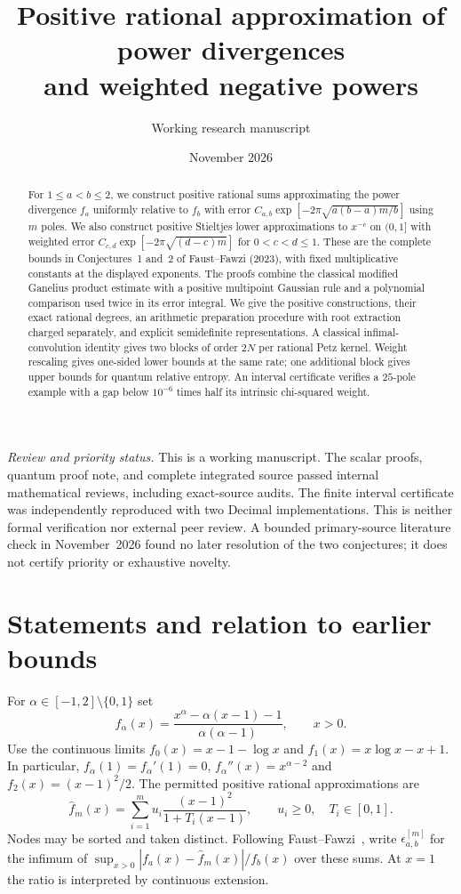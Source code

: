 \documentclass[11pt]{article}
\title{Positive rational approximation of power divergences\texorpdfstring{\\}{ }and weighted negative powers}
\author{Working research manuscript}
\date{November 2026}
\numberwithin{equation}{section}
\begin{document}
\maketitle

\begin{abstract}
For $1\le a<b\le2$, we construct positive rational sums approximating
the power divergence $f_a$ uniformly relative to $f_b$ with error
$C_{a,b}\exp[-2\pi\sqrt{a(b-a)m/b}]$ using $m$ poles. We also construct
positive Stieltjes lower approximations to $x^{-c}$ on $(0,1]$ with
weighted error $C_{c,d}\exp[-2\pi\sqrt{(d-c)m}]$ for $0<c<d\le1$.
These are the complete bounds in Conjectures~1 and~2 of
Faust--Fawzi (2023), with fixed multiplicative constants at the
displayed exponents. The proofs combine the classical modified
Ganelius product estimate with a positive multipoint Gaussian rule
and a polynomial comparison used twice in its error integral.
We give the positive constructions, their exact rational degrees,
an arithmetic preparation procedure with root extraction charged
separately, and explicit semidefinite representations. A classical
infimal-convolution identity gives two blocks of order $2N$ per
rational Petz kernel. Weight rescaling gives one-sided lower bounds
at the same rate; one additional block gives upper bounds for quantum
relative entropy. An interval certificate verifies a $25$-pole example
with a gap below $10^{-6}$ times half its intrinsic chi-squared weight.
\end{abstract}

\noindent\textit{Review and priority status.}
This is a working manuscript. The scalar proofs, quantum proof note,
and complete integrated source passed internal mathematical reviews,
including exact-source audits.
The finite interval certificate was independently reproduced with two
Decimal implementations. This is neither formal verification nor
external peer review. A bounded primary-source
literature check in November~2026 found no later resolution of the two
conjectures; it does not certify priority or exhaustive novelty.

\section{Statements and relation to earlier bounds}

For $\alpha\in[-1,2]\setminus\{0,1\}$ set
\begin{equation}\label{eq:falpha}
 f_\alpha(x)=\frac{x^\alpha-\alpha(x-1)-1}{\alpha(\alpha-1)},
 \qquad x>0.
\end{equation}
Use the continuous limits
$f_0(x)=x-1-\log x$ and $f_1(x)=x\log x-x+1$.
In particular, $f_\alpha(1)=f_\alpha'(1)=0$,
$f_\alpha''(x)=x^{\alpha-2}$ and $f_2(x)=(x-1)^2/2$.
The permitted positive rational approximations are
\begin{equation}\label{eq:allowed}
 \widehat f_m(x)=\sum_{i=1}^m u_i
       \frac{(x-1)^2}{1+T_i(x-1)},\qquad u_i\ge0,\quad T_i\in[0,1].
\end{equation}
Nodes may be sorted and taken distinct. Following
Faust--Fawzi~\cite{FF}, write $\epsilon^{[m]}_{a,b}$ for the infimum of
$\sup_{x>0}|f_a(x)-\widehat f_m(x)|/f_b(x)$ over these sums. At $x=1$
the ratio is interpreted by continuous extension.
\end{document}
